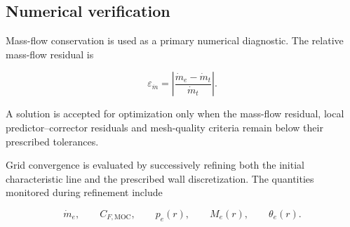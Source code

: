 \subsection{Numerical verification}

Mass-flow conservation is used as a primary numerical diagnostic. The
relative mass-flow residual is

\begin{equation}
    \boxed{
    \varepsilon_{\dot m}
    =
    \left|
    \frac{\dot m_e-\dot m_t}{\dot m_t}
    \right|
    }.
    \label{eq:moc_mass_residual}
\end{equation}

A solution is accepted for optimization only when the mass-flow
residual, local predictor--corrector residuals and mesh-quality criteria
remain below their prescribed tolerances.

Grid convergence is evaluated by successively refining both the initial
characteristic line and the prescribed wall discretization. The
quantities monitored during refinement include

\begin{equation}
    \dot m_e,\qquad
    C_{F,\mathrm{MOC}},\qquad
    p_e(r),\qquad
    M_e(r),\qquad
    \theta_e(r).
\end{equation}

